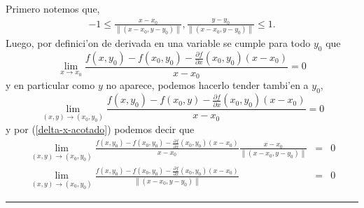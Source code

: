 \documentclass[a4paper,spanish]{article}
\newcommand{\norma}[1]{\left\|#1\right\|}
\newcommand{\limite}[2]{\lim_{ #1 \rightarrow #2}}
\newcommand{\parcial}[2]{\frac{\partial #1}{\partial #2}}
\newenvironment{demo}{{\noindent \textbf{Demo: }}}{\hfill\rule{2mm}{2mm}\par}
\begin{document}
\begin{enumerate}
\begin{demo}
Primero notemos que,
\begin{eqnarray}
\label{delta-x-acotado}
-1 \leq \frac{x-x_0}{\norma{(x-x_0,y-y_0)}},
	\frac{y-y_0}{\norma{(x-x_0,y-y_0)}}  \leq 1.
\end{eqnarray}
Luego, por definici'on de derivada en una variable se cumple para todo $y_0$
que
$$\limite{x}{x_0} \frac{f(x,y_0)-f(x_0,y_0)-\parcial{f}{x}(x_0,y_0)(x-x_0)}
                       {x-x_0} = 0$$
y en particular como $y$ no aparece, podemos hacerlo tender tambi'en a $y_0$,
$$\limite{(x,y)}{(x_0,y_0)} \frac{f(x,y_0)-f(x_0,y)-
                                    \parcial{f}{x}(x_0,y_0)(x-x_0)}
                       	         {x-x_0} = 0$$
y por (\ref{delta-x-acotado}) podemos decir que
\begin{eqnarray}
\limite{(x,y)}{(x_0,y_0)} \frac{f(x,y_0)-f(x_0,y_0)-
                                    \parcial{f}{x}(x_0,y_0)(x-x_0)}
                       	       {x-x_0} 
                       	  \frac{x-x_0}
                       	       {\norma{(x-x_0,y-y_0)}} &=& 0 \nonumber \\
\label{elim-dx}
\limite{(x,y)}{(x_0,y_0)} \frac{f(x,y_0)-f(x_0,y_0)-
                                    \parcial{f}{x}(x_0,y_0)(x-x_0)}
                       	       {\norma{(x-x_0,y-y_0)}} &=& 0
\end{eqnarray}


\end{demo}
\end{enumerate}
\end{document}
